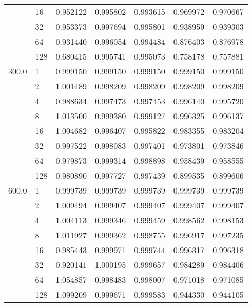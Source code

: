 \begin{tabular}{llrrrrr}
      & 16  &  0.952122 &  0.995802 &  0.993615 &  0.969972 &  0.970667 \\
      & 32  &  0.953373 &  0.997694 &  0.995801 &  0.938959 &  0.939303 \\
      & 64  &  0.931440 &  0.996054 &  0.994484 &  0.876403 &  0.876978 \\
      & 128 &  0.680415 &  0.995741 &  0.995073 &  0.758178 &  0.757881 \\
300.0 & 1   &  0.999150 &  0.999150 &  0.999150 &  0.999150 &  0.999150 \\
      & 2   &  1.001489 &  0.998209 &  0.998209 &  0.998209 &  0.998209 \\
      & 4   &  0.988634 &  0.997473 &  0.997453 &  0.996140 &  0.995720 \\
      & 8   &  1.013500 &  0.999380 &  0.999127 &  0.996325 &  0.996137 \\
      & 16  &  1.004682 &  0.996407 &  0.995822 &  0.983355 &  0.983204 \\
      & 32  &  0.997522 &  0.998083 &  0.997401 &  0.973801 &  0.973846 \\
      & 64  &  0.979873 &  0.999314 &  0.998898 &  0.958439 &  0.958555 \\
      & 128 &  0.980890 &  0.997727 &  0.997439 &  0.899535 &  0.899606 \\
600.0 & 1   &  0.999739 &  0.999739 &  0.999739 &  0.999739 &  0.999739 \\
      & 2   &  1.009494 &  0.999407 &  0.999407 &  0.999407 &  0.999407 \\
      & 4   &  1.004113 &  0.999346 &  0.999459 &  0.998562 &  0.998153 \\
      & 8   &  1.011927 &  0.999362 &  0.998755 &  0.996917 &  0.997235 \\
      & 16  &  0.985443 &  0.999971 &  0.999744 &  0.996317 &  0.996318 \\
      & 32  &  0.920141 &  1.000195 &  0.999657 &  0.984289 &  0.984406 \\
      & 64  &  1.054857 &  0.998483 &  0.998007 &  0.971018 &  0.971085 \\
      & 128 &  1.099209 &  0.999671 &  0.999583 &  0.944330 &  0.944105 \\
\bottomrule
\end{tabular}
